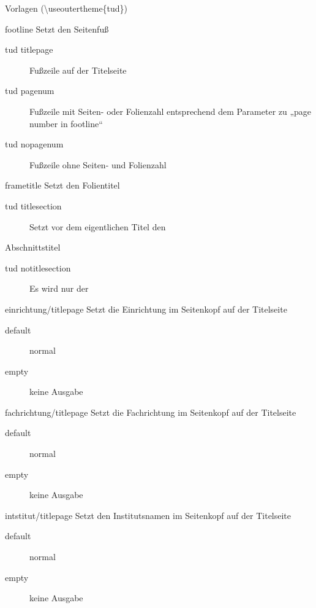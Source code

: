 \documentclass[presentation,t]{beamer}
\begin{document}
\begin{frame}[allowframebreaks,label=sec-2-2-4]{Vorlagen (\textbackslash useoutertheme\{tud\})}
\begin{block}{footline}
Setzt den Seitenfuß

\begin{description}
\item[{tud titlepage}] Fußzeile auf der Titelseite
\item[{tud pagenum}] Fußzeile mit Seiten- oder Folienzahl entsprechend dem
Parameter zu „page number in footline“
\item[{tud nopagenum}] Fußzeile ohne Seiten- und Folienzahl
\end{description}
\end{block}

\begin{block}{frametitle}
Setzt den Folientitel
\begin{description}
\item[{tud titlesection}] Setzt vor dem eigentlichen Titel den
\end{description}
Abschnittstitel
\begin{description}
\item[{tud notitlesection}] Es wird nur der
\end{description}
\end{block}

\begin{block}{einrichtung/titlepage}
Setzt die Einrichtung im Seitenkopf auf der Titelseite

\begin{description}
\item[{default}] normal
\item[{empty}] keine Ausgabe
\end{description}
\end{block}
\begin{block}{fachrichtung/titlepage}
Setzt die Fachrichtung im Seitenkopf auf der Titelseite

\begin{description}
\item[{default}] normal
\item[{empty}] keine Ausgabe
\end{description}
\end{block}
\begin{block}{intstitut/titlepage}
Setzt den Institutsnamen im Seitenkopf auf der Titelseite

\begin{description}
\item[{default}] normal
\item[{empty}] keine Ausgabe
\end{description}
\end{block}


\end{frame}
\end{document}
